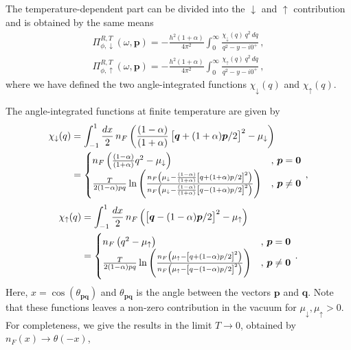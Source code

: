 The temperature-dependent part can be divided into the $\downarrow$ and $\uparrow$ contribution and is obtained by the same means
\begin{align}
	\Pi^{R,T}_{\phi,\downarrow}(\omega, \bm{p}) = -
	\frac{h^2(1+\alpha)}{4\pi^2} \int_0^{\infty}
	\frac{\chi_{\downarrow}(q) \, q^2 \, dq}{q^2-y-i0^+} \,,
\end{align}
\begin{align}
	\Pi^{R,T}_{\phi,\uparrow}(\omega, \bm{p}) = -
	\frac{h^2(1+\alpha)}{4\pi^2} \int_0^{\infty}
	\frac{\chi_{\uparrow}(q) \, q^2 \, dq}{q^2-y-i0^+} \,,
\end{align}
where we have defined the two angle-integrated functions $\chi_{\downarrow}(q)$ and $\chi_{\uparrow}(q)$.

The angle-integrated functions at finite temperature are given by
\begin{align}
	\chi_{\downarrow}(q) &= \int_{-1}^1 \frac{dx}{2} \,
	n_F\left(\frac{(1-\alpha)}{(1+\alpha)}
	\left[\bm{q}+(1+\alpha)\bm{p}/2\right]^2
	-\mu_{\downarrow}\right) \notag \\
	&=
	\begin{cases}
		n_F\left(\frac{(1-\alpha)}{(1+\alpha)}
		q^2-\mu_{\downarrow}\right) & ,\, \bm{p} = \bm{0} \\
		\frac{T}{2(1-\alpha)pq} \ln\left( \frac{
			n_F\left(\mu_{\downarrow}-\frac{(1-\alpha)}{(1+\alpha)}
			\left[q+(1+\alpha)p/2\right]^2\right)}{
			n_F\left(\mu_{\downarrow}-\frac{(1-\alpha)}{(1+\alpha)}
			\left[q-(1+\alpha)p/2\right]^2\right)}
		\right) & ,\, \bm{p} \neq \bm{0}
	\end{cases} \,,
\end{align}
\begin{align}
	\chi_{\uparrow}(q) &= \int_{-1}^1 \frac{dx}{2} \,
	n_F\left(\left[\bm{q}-(1-\alpha)\bm{p}/2\right]^2
	-\mu_{\uparrow}\right) \notag \\
	&=
	\begin{cases}
		n_F\left(q^2-\mu_{\uparrow}\right) & ,\, \bm{p} = \bm{0} \\
		\frac{T}{2(1-\alpha)pq} \ln\left( \frac{
			n_F\left(\mu_{\uparrow}-\left[q+(1-\alpha)p/2\right]^2\right)}{
			n_F\left(\mu_{\uparrow}-\left[q-(1-\alpha)p/2\right]^2\right)}
		\right) & ,\, \bm{p} \neq \bm{0}
	\end{cases} \,.
\end{align}
Here, $x=\cos(\theta_{\bm{pq}})$ and $\theta_{\bm{pq}}$ is the angle between the vectors $\bm{p}$ and $\bm{q}$. Note that these functions leaves a non-zero contribution in the vacuum for $\mu_{\downarrow},\mu_{\uparrow}>0$. For completeness, we give the results in the limit $T\rightarrow 0$, obtained by $n_F(x)\rightarrow\theta(-x)$,
